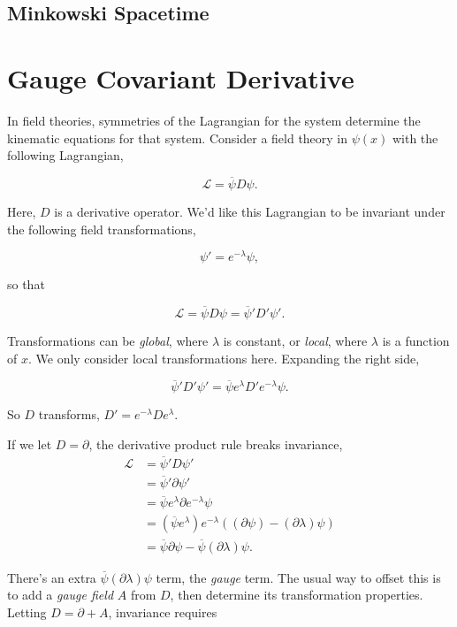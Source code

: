 	\subsection{Minkowski Spacetime}
	
	\section{Gauge Covariant Derivative}
	
	In field theories, symmetries of the Lagrangian for the system determine the kinematic equations for that system. Consider a field theory in $\psi\left(x\right)$ with the following Lagrangian,
	
	\[
	\mathcal{L} = \overline{\psi} D \psi.
	\]
	
	Here, $D$ is a derivative operator. We'd like this Lagrangian to be invariant under the following field transformations,
	
	\[
	\psi' = e^{-\lambda}\psi,
	\]
	
	so that
	
	\[
	\mathcal{L} = \overline{\psi} D \psi = \overline{\psi}' D' \psi'.
	\]
	
	Transformations can be \emph{global}, where $\lambda$ is constant, or \emph{local}, where $\lambda$ is a function of $x$. We only consider local transformations here. Expanding the right side,
	
	\[
	\overline{\psi}' D' \psi' = \overline{\psi}e^{\lambda} D'e^{-\lambda}\psi.
	\]
	
	So $D$ transforms, $D' = e^{-\lambda} De^{\lambda}.$
	
	If we let $D = \partial$, the derivative product rule breaks invariance,	
	\begin{align*}
	\mathcal{L} &= \overline{\psi}' D \psi' \\
	&= \overline{\psi}' \partial \psi' \\
	&= \overline{\psi}e^{\lambda} \partial e^{-\lambda}\psi \\
	&= \left(\overline{\psi}e^{\lambda}\right) e^{-\lambda}\left(\left(\partial\psi\right) - \left(\partial\lambda\right)\psi\right) \\
	&= \overline{\psi}\partial\psi - \overline{\psi}\left(\partial\lambda\right)\psi.
	\end{align*} 
	
	There's an extra $\overline{\psi}\left(\partial\lambda\right)\psi$ term, the \emph{gauge} term. The usual way to offset this is to add a \emph{gauge field} $A$ from $D$, then determine its transformation properties. Letting $D = \partial + A$, invariance requires
	
